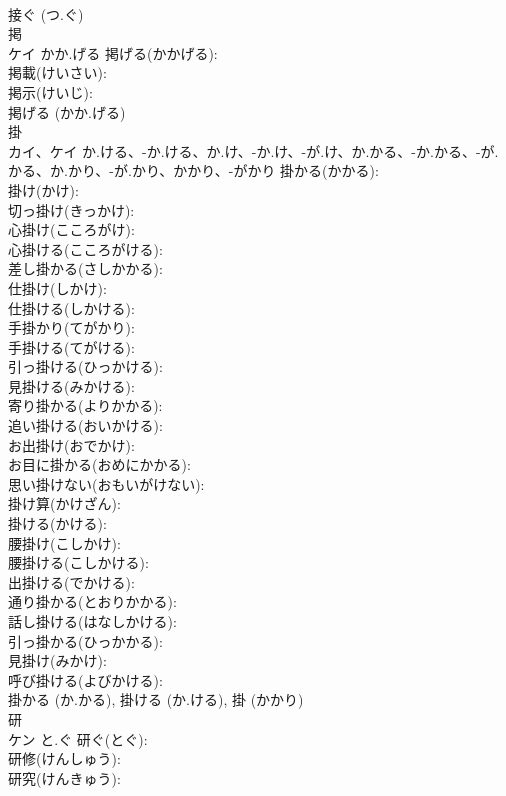 \documentclass[8pt]{extreport}
\begin{document}
\begin{CJK}{UTF8}{min}
\\	接ぐ (つ.ぐ)
\\	掲			
\\	ケイ	かか.げる	掲げる(かかげる): 
\\	掲載(けいさい): 
\\	掲示(けいじ): 
\\	掲げる (かか.げる)
\\	掛			
\\	カイ、ケイ	か.ける、-か.ける、か.け、-か.け、-が.け、か.かる、-か.かる、-が.かる、か.かり、-が.かり、かかり、-がかり	掛かる(かかる): 
\\	掛け(かけ): 
\\	切っ掛け(きっかけ): 
\\	心掛け(こころがけ): 
\\	心掛ける(こころがける): 
\\	差し掛かる(さしかかる): 
\\	仕掛け(しかけ): 
\\	仕掛ける(しかける): 
\\	手掛かり(てがかり): 
\\	手掛ける(てがける): 
\\	引っ掛ける(ひっかける): 
\\	見掛ける(みかける): 
\\	寄り掛かる(よりかかる): 
\\	追い掛ける(おいかける): 
\\	お出掛け(おでかけ): 
\\	お目に掛かる(おめにかかる): 
\\	思い掛けない(おもいがけない): 
\\	掛け算(かけざん): 
\\	掛ける(かける): 
\\	腰掛け(こしかけ): 
\\	腰掛ける(こしかける): 
\\	出掛ける(でかける): 
\\	通り掛かる(とおりかかる): 
\\	話し掛ける(はなしかける): 
\\	引っ掛かる(ひっかかる): 
\\	見掛け(みかけ): 
\\	呼び掛ける(よびかける): 
\\	掛かる (か.かる), 掛ける (か.ける), 掛 (かかり)
\\	研			
\\	ケン	と.ぐ	研ぐ(とぐ): 
\\	研修(けんしゅう): 
\\	研究(けんきゅう): 

\end{CJK}
\end{document}
